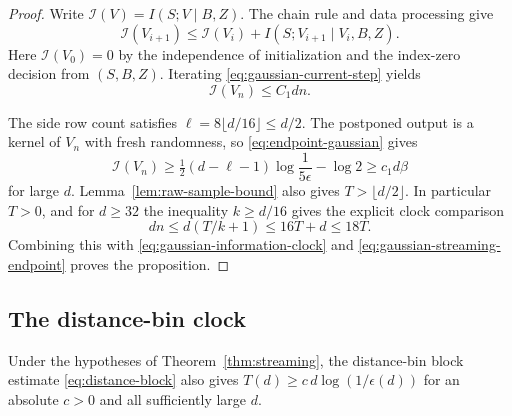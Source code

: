 \begin{proof}
Write $\mathcal I(V)=I(S;V\mid B,Z)$. The chain rule and data processing
give
\[
 \mathcal I(V_{i+1})
 \le \mathcal I(V_i)+I(S;V_{i+1}\mid V_i,B,Z).
\]
Here $\mathcal I(V_0)=0$ by the independence of initialization and the
index-zero decision from $(S,B,Z)$. Iterating
\eqref{eq:gaussian-current-step} yields
\begin{equation}\label{eq:gaussian-information-clock}
 \mathcal I(V_n)\le C_1dn.
\end{equation}

The side row count satisfies $\ell=8\lfloor d/16\rfloor\le d/2$.
The postponed output is a kernel of $V_n$ with fresh randomness, so
\eqref{eq:endpoint-gaussian} gives
\begin{equation}\label{eq:gaussian-streaming-endpoint}
 \mathcal I(V_n)\ge
 \tfrac12(d-\ell-1)\log\frac1{5\epsilon}-\log2
 \ge c_1d\beta
\end{equation}
for large $d$. Lemma~\ref{lem:raw-sample-bound} also gives
$T>\lfloor d/2\rfloor$. In particular $T>0$, and for $d\ge32$ the
inequality $k\ge d/16$ gives the explicit clock comparison
\[
 dn\le d(T/k+1)\le16T+d\le18T.
\]
Combining this with \eqref{eq:gaussian-information-clock} and
\eqref{eq:gaussian-streaming-endpoint} proves the proposition.
\end{proof}

\subsection{The distance-bin clock}

\begin{proposition}
\label{prop:distance-streaming}
Under the hypotheses of Theorem~\ref{thm:streaming}, the distance-bin
block estimate \eqref{eq:distance-block} also gives
$T(d)\ge c\,d\log(1/\epsilon(d))$ for an absolute $c>0$ and all
sufficiently large $d$.
\end{proposition}

